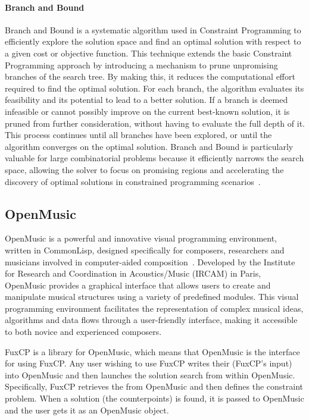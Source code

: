 \paragraph{Branch and Bound}
Branch and Bound is a systematic algorithm used in Constraint Programming to efficiently explore the solution space and find an optimal solution with respect to a given cost or objective function. This technique extends the basic Constraint Programming approach by introducing a mechanism to prune unpromising branches of the search tree. By making this, it reduces the computational effort required to find the optimal solution. For each branch, the algorithm evaluates its feasibility and its potential to lead to a better solution. If a branch is deemed infeasible or cannot possibly improve on the current best-known solution, it is pruned from further consideration, without having to evaluate the full depth of it. This process continues until all branches have been explored, or until the algorithm converges on the optimal solution. Branch and Bound is particularly valuable for large combinatorial problems because it efficiently narrows the search space, allowing the solver to focus on promising regions and accelerating the discovery of optimal solutions in constrained programming scenarios~\cite{morrison2016branch}. 


\subsection{OpenMusic}
OpenMusic is a powerful and innovative visual programming environment, written in CommonLisp, designed specifically for composers, researchers and musicians involved in computer-aided composition~\cite{OpenMusic}. Developed by the Institute for Research and Coordination in Acoustics/Music (IRCAM) in Paris, OpenMusic provides a graphical interface that allows users to create and manipulate musical structures using a variety of predefined modules. This visual programming environment facilitates the representation of complex musical ideas, algorithms and data flows through a user-friendly interface, making it accessible to both novice and experienced composers. 


FuxCP is a library for OpenMusic, which means that OpenMusic is the interface for using FuxCP. Any user wishing to use FuxCP writes their \cfs (FuxCP's input) into OpenMusic and then launches the solution search from within OpenMusic. Specifically, FuxCP retrieves the \cfs from OpenMusic and then defines the constraint problem. When a solution (the counterpoints) is found, it is passed to OpenMusic and the user gets it as an OpenMusic object.

